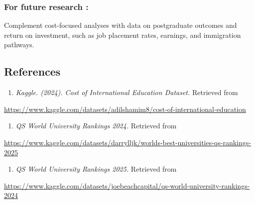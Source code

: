 \documentclass[
  letterpaper,
  DIV=11,
  numbers=noendperiod]{scrartcl}
\providecommand{\tightlist}{%
  \setlength{\itemsep}{0pt}\setlength{\parskip}{0pt}}\usepackage{longtable,booktabs,array}
\begin{document}
\subsubsection{For future research :}\label{for-future-research}

Complement cost-focused analyses with data on postgraduate outcomes and
return on investment, such as job placement rates, earnings, and
immigration pathways.

\subsection{References}\label{references}

\begin{enumerate}
\def\labelenumi{\arabic{enumi}.}
\tightlist
\item
  \emph{Kaggle. (2024). Cost of International Education Dataset.}
  Retrieved from
\end{enumerate}

\url{https://www.kaggle.com/datasets/adilshamim8/cost-of-international-education}

\begin{enumerate}
\def\labelenumi{\arabic{enumi}.}
\setcounter{enumi}{1}
\tightlist
\item
  \emph{QS World University Rankings 2024.} Retrieved from
\end{enumerate}

\url{https://www.kaggle.com/datasets/darrylljk/worlds-best-universities-qs-rankings-2025}

\begin{enumerate}
\def\labelenumi{\arabic{enumi}.}
\setcounter{enumi}{2}
\tightlist
\item
  \emph{QS World University Rankings 2025.} Retrieved from
\end{enumerate}

\url{https://www.kaggle.com/datasets/joebeachcapital/qs-world-university-rankings-2024}
\end{document}

